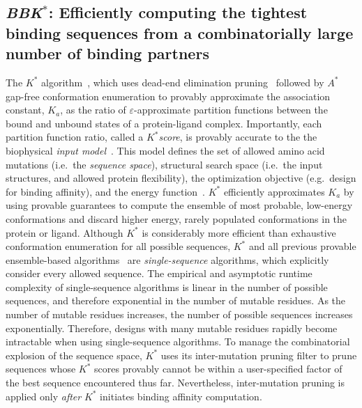 \def\as{\textit{$A^*$}\xspace}
\def\ks{\textit{$K^*$}\xspace}
\def\ka{\textit{$K_a$}\xspace}
\def\bbks{\textit{BBK$^*$}\xspace}
\def\multisequencebound{MS\xspace}
\def\msbound{\multisequencebound}

\subsection{\bbks: Efficiently computing the tightest binding sequences from a combinatorially large number of binding partners}

The \ks algorithm~\cite{}, which uses dead-end elimination pruning~\cite{} followed by \as~\cite{} gap-free conformation enumeration to provably approximate the association constant, \ka, as the ratio of $\varepsilon$-approximate partition functions between the bound and unbound states of a protein-ligand complex. Importantly, each partition function ratio, called a \ks \emph{score}, is provably accurate to the the biophysical \emph{input model}~\cite{}. This model defines the set of allowed amino acid mutations (i.e.~the \emph{sequence space}), structural search space (i.e.~the input structures, and allowed protein flexibility), the optimization objective (e.g.~design for binding affinity), and the energy function~\cite{}. \ks efficiently approximates \ka by using provable guarantees to compute the ensemble of most probable, low-energy conformations and discard higher energy, rarely populated conformations in the protein or ligand. Although \ks is considerably more efficient than exhaustive conformation enumeration for all possible sequences, \ks and all previous provable ensemble-based algorithms~\cite{} are \emph{single-sequence} algorithms, which explicitly consider every allowed sequence. The empirical and asymptotic runtime complexity of single-sequence algorithms is linear in the number of possible sequences, and therefore exponential in the number of mutable residues. As the number of mutable residues increases, the number of possible sequences increases exponentially. Therefore, designs with many mutable residues rapidly become intractable when using single-sequence algorithms. To manage the combinatorial explosion of the sequence space, \ks uses its inter-mutation pruning filter to prune sequences whose \ks scores provably cannot be within a user-specified factor of the best sequence encountered thus far. Nevertheless, inter-mutation pruning is applied only \emph{after} \ks initiates binding affinity computation.

